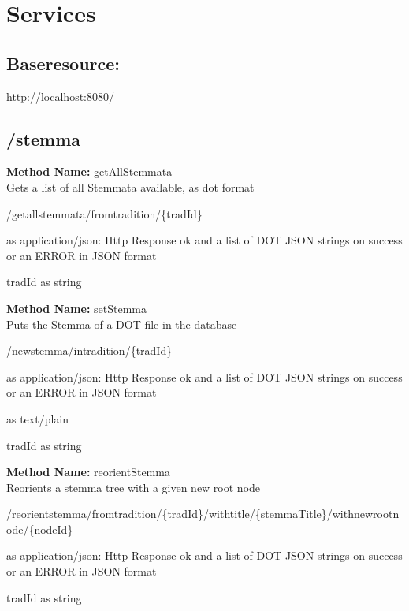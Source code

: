 \chapter{Services}
\section{Baseresource: }
http://localhost:8080/
\section{/stemma}
\textbf{Method Name: }getAllStemmata \\ Gets a list of all Stemmata available, as dot format
\begin{get}
/getallstemmata/fromtradition/\{tradId\}
\end{get}
\begin{response}
 as application/json: Http Response ok and a list of DOT JSON strings on success or an ERROR in JSON format
\end{response}
\begin{parameter}
tradId as string
\end{parameter}
\textbf{Method Name: }setStemma \\ Puts the Stemma of a DOT file in the database
\begin{post}
/newstemma/intradition/\{tradId\}
\end{post}
\begin{request}
 as application/json: Http Response ok and a list of DOT JSON strings on success or an ERROR in JSON format
\end{request}
\begin{response}
 as text/plain
\end{response}
\begin{parameter}
tradId as string
\end{parameter}
\textbf{Method Name: }reorientStemma \\ Reorients a stemma tree with a given new root node
\begin{post}
/reorientstemma/fromtradition/\{tradId\}/withtitle/\{stemmaTitle\}/withnewrootnode/\{nodeId\}
\end{post}
\begin{response}
 as application/json: Http Response ok and a list of DOT JSON strings on success or an ERROR in JSON format
\end{response}
\begin{parameter}
tradId as string
\end{parameter}
